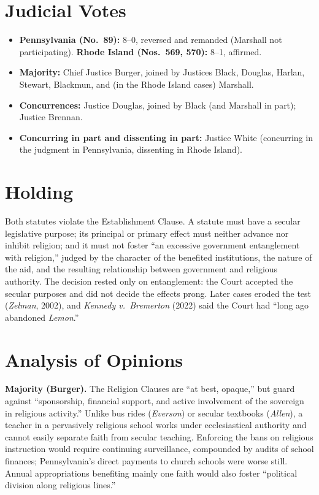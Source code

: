 \documentclass[12pt]{article}
\begin{document}
\section{Judicial Votes}

\begin{itemize}
\item \textbf{Pennsylvania (No.\ 89):} 8--0, reversed and remanded (Marshall not participating). \textbf{Rhode Island (Nos.\ 569, 570):} 8--1, affirmed.
\item \textbf{Majority:} Chief Justice Burger, joined by Justices Black, Douglas, Harlan, Stewart, Blackmun, and (in the Rhode Island cases) Marshall.
\item \textbf{Concurrences:} Justice Douglas, joined by Black (and Marshall in part); Justice Brennan.
\item \textbf{Concurring in part and dissenting in part:} Justice White (concurring in the judgment in Pennsylvania, dissenting in Rhode Island).
\end{itemize}

\section{Holding}

Both statutes violate the Establishment Clause. A statute must have a secular legislative purpose; its principal or primary effect must neither advance nor inhibit religion; and it must not foster ``an excessive government entanglement with religion,'' judged by the character of the benefited institutions, the nature of the aid, and the resulting relationship between government and religious authority. The decision rested only on entanglement: the Court accepted the secular purposes and did not decide the effects prong. Later cases eroded the test (\textit{Zelman}, 2002), and \textit{Kennedy v.\ Bremerton} (2022) said the Court had ``long ago abandoned \textit{Lemon}.''

\section{Analysis of Opinions}

\textbf{Majority (Burger).} The Religion Clauses are ``at best, opaque,'' but guard against ``sponsorship, financial support, and active involvement of the sovereign in religious activity.'' Unlike bus rides (\textit{Everson}) or secular textbooks (\textit{Allen}), a teacher in a pervasively religious school works under ecclesiastical authority and cannot easily separate faith from secular teaching. Enforcing the bans on religious instruction would require continuing surveillance, compounded by audits of school finances; Pennsylvania's direct payments to church schools were worse still. Annual appropriations benefiting mainly one faith would also foster ``political division along religious lines.''
\end{document}
